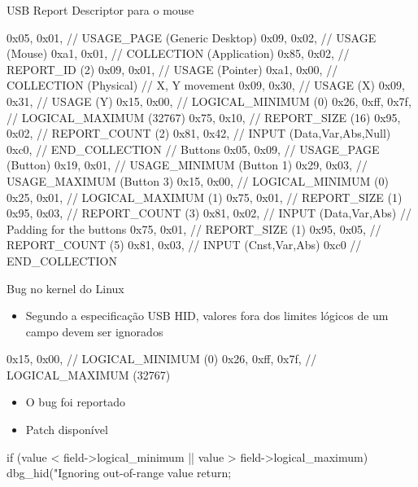 \documentclass{beamer}
\begin{document}
\begin{frame}[fragile]{USB Report Descriptor para o mouse}
	\begin{ccodesmall}
	0x05, 0x01,        // USAGE_PAGE (Generic Desktop)
	0x09, 0x02,        // USAGE (Mouse)
	0xa1, 0x01,        // COLLECTION (Application)
	0x85, 0x02,	       //   REPORT_ID (2)
	0x09, 0x01,        //   USAGE (Pointer)
	0xa1, 0x00,        //   COLLECTION (Physical)
	// X, Y movement
	0x09, 0x30,        //     USAGE (X)
	0x09, 0x31,        //     USAGE (Y)
	0x15, 0x00,        //     LOGICAL_MINIMUM (0)
	0x26, 0xff, 0x7f,  //     LOGICAL_MAXIMUM (32767)
	0x75, 0x10,        //     REPORT_SIZE (16)
	0x95, 0x02,        //     REPORT_COUNT (2)
	0x81, 0x42,        //     INPUT (Data,Var,Abs,Null)
	0xc0,              //   END_COLLECTION
	// Buttons
	0x05, 0x09,        //   USAGE_PAGE (Button)
	0x19, 0x01,        //   USAGE_MINIMUM (Button 1)
	0x29, 0x03,        //   USAGE_MAXIMUM (Button 3)
	0x15, 0x00,        //   LOGICAL_MINIMUM (0)
	0x25, 0x01,        //   LOGICAL_MAXIMUM (1)
	0x75, 0x01,        //   REPORT_SIZE (1)
	0x95, 0x03,        //   REPORT_COUNT (3)
	0x81, 0x02,        //   INPUT (Data,Var,Abs)
	// Padding for the buttons
	0x75, 0x01,        //   REPORT_SIZE (1)
	0x95, 0x05,        //   REPORT_COUNT (5)
	0x81, 0x03,        //   INPUT (Cnst,Var,Abs)
	0xc0               // END_COLLECTION
	\end{ccodesmall}
\end{frame}


\begin{frame}[fragile]{Bug no kernel do Linux}
	\begin{itemize}
		\pause
		\item Segundo a especificação USB HID, valores fora dos limites lógicos de um campo devem ser ignorados
	\end{itemize}
	\pause
	\begin{ccode}[numbers=none]
	0x15, 0x00,        //     LOGICAL_MINIMUM (0)
	0x26, 0xff, 0x7f,  //     LOGICAL_MAXIMUM (32767)
	\end{ccode}
	\begin{itemize}
		\pause
		\item O bug foi reportado
		\pause
		\item Patch disponível
	\end{itemize}
	\begin{ccode}[numbers=none]
	if (value < field->logical_minimum ||
	    value > field->logical_maximum)
	{
	    dbg_hid("Ignoring out-of-range value %
	    return;
	}
	\end{ccode}
\end{frame}
\end{document}
